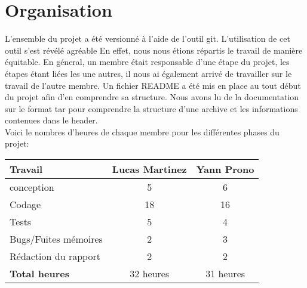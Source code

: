 \documentclass[a4paper,11pt, oneside]{book}
\begin{document}
\section*{Organisation}
	L'ensemble du projet a été versionné à l'aide de l'outil git. L'utilisation de cet outil s'est révélé agréable En effet, nous nous étions répartis le travail de manière équitable. En géneral, un membre était responsable d'une étape du projet, les étapes étant liées les une autres, il nous ai également arrivé de travailler sur le travail de l'autre membre. Un fichier README a été mis en place au tout début du projet afin d'en comprendre sa structure. Nous avons lu de la documentation sur le format tar pour comprendre la structure d'une archive et  les informations contenues dans le header.\\

	\noindent Voici le nombres d'heures de chaque membre pour les différentes phases du projet:\\

	\begin{center}
		\noindent\begin{tabular}{|l|c|c|}
	\hline
		\textbf{Travail} 	& \textbf{Lucas Martinez} 	& \textbf{Yann Prono} \\
	\hline
		conception 			& 5 							& 6  	 \\
		Codage 				& 18							& 16 \\
		Tests 				& 	5						& 4 \\
		Bugs/Fuites mémoires 	& 	2						& 3 \\
		Rédaction du rapport & 2							& 2 \\
	\hline
		\textbf{Total heures} & 32 heures & 31 heures \\
		\hline
	\end{tabular}
	\end{center}

\newpage

\end{document}
